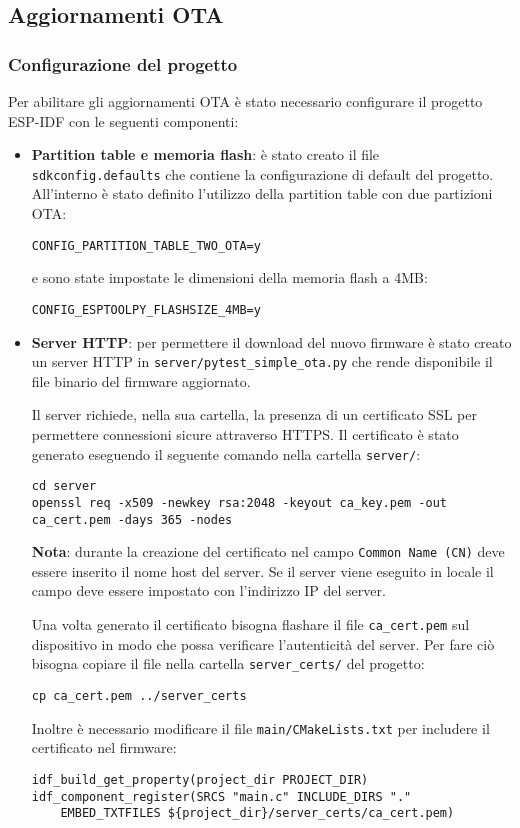 \documentclass[a4paper]{article}
\begin{document}
\subsection{Aggiornamenti OTA}
\subsubsection{Configurazione del progetto}
Per abilitare gli aggiornamenti OTA è stato necessario configurare il progetto ESP-IDF
con le seguenti componenti:
\begin{itemize}
  \item \textbf{Partition table e memoria flash}: è stato creato il file\\
    \texttt{sdkconfig.defaults}
    che contiene la configurazione di default del progetto. All'interno è stato
    definito l'utilizzo della partition table con due partizioni OTA:
\begin{lstlisting}
CONFIG_PARTITION_TABLE_TWO_OTA=y
\end{lstlisting}
    e sono state impostate le dimensioni della memoria flash a 4MB:
\begin{lstlisting}
CONFIG_ESPTOOLPY_FLASHSIZE_4MB=y
\end{lstlisting}

  \item \textbf{Server HTTP}: per permettere il download del nuovo firmware è stato
    creato un server HTTP in \texttt{server/pytest\_simple\_ota.py} che rende
    disponibile il file binario del firmware aggiornato.

    Il server richiede, nella sua cartella, la presenza di un certificato SSL per
    permettere connessioni sicure attraverso HTTPS. Il certificato è stato generato
    eseguendo il seguente comando nella cartella \texttt{server/}:
\begin{lstlisting}
cd server
openssl req -x509 -newkey rsa:2048 -keyout ca_key.pem -out ca_cert.pem -days 365 -nodes
\end{lstlisting}
    \textbf{Nota}: durante la creazione del certificato nel campo \texttt{Common Name (CN)}
    deve essere inserito il nome host del server. Se il server viene eseguito in locale
    il campo deve essere impostato con l'indirizzo IP del server.

    Una volta generato il certificato bisogna flashare il file \texttt{ca\_cert.pem}
    sul dispositivo in modo che possa verificare l'autenticità del server.
    Per fare ciò bisogna copiare il file nella cartella \texttt{server\_certs/} del
    progetto:
\begin{lstlisting}
cp ca_cert.pem ../server_certs
\end{lstlisting}
    Inoltre è necessario modificare il file \texttt{main/CMakeLists.txt} per includere
    il certificato nel firmware:
\begin{lstlisting}
idf_build_get_property(project_dir PROJECT_DIR)
idf_component_register(SRCS "main.c" INCLUDE_DIRS "."
    EMBED_TXTFILES ${project_dir}/server_certs/ca_cert.pem)
\end{lstlisting}


\end{itemize}
\end{document}
